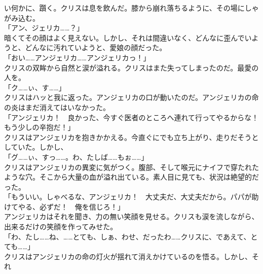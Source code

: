 \documentclass[b5j,10pt,openany]{jsbook}
\begin{document}
い何かに、躓く。クリスは息を飲んだ。膝から崩れ落ちるように、その場にしゃがみ込む。\\「アン、ジェリカ\ldots{}\ldots{}？」\\暗くてその顔はよく見えない。しかし、それは間違いなく、どんなに歪んでいようと、どんなに汚れていようと、愛娘の顔だった。\\「おい\ldots{}\ldots{}アンジェリカ\ldots{}\ldots{}アンジェリカっ！」\\クリスの双眸から自然と涙が溢れる。クリスはまた失ってしまったのだ。最愛の人を。\\「ク\ldots{}\ldots{}ぃ、す\ldots{}\ldots{}」\\クリスはハッと我に返った。アンジェリカの口が動いたのだ。アンジェリカの命の炎はまだ消えてはいなかった。\\「アンジェリカ！　良かった、今すぐ医者のところへ連れて行ってやるからな！　もう少しの辛抱だ！」\\クリスはアンジェリカを抱きかかえる。今直ぐにでも立ち上がり、走りだそうとしていた。しかし、\\「グ\ldots{}\ldots{}ぃ、すっ\ldots{}\ldots{}。わ、たしば\ldots{}\ldots{}もぉ\ldots{}\ldots{}」\\クリスはアンジェリカの異変に気がつく。腹部、そして喉元にナイフで穿たれたような穴。そこから大量の血が溢れ出ている。素人目に見ても、状況は絶望的だった。\\「もういい。しゃべるな、アンジェリカ！　大丈夫だ、大丈夫だから。パパが助けてやる、必ずだ！　俺を信じろ！」\\アンジェリカはそれを聞き、力の無い笑顔を見せる。クリスも涙を流しながら、出来るだけの笑顔を作ってみせた。\\「わ、たし\ldots{}\ldots{}ね、\ldots{}\ldots{}とても、しぁ、わせ、だったわ\ldots{}\ldots{}クリスに、であえて、とても\ldots{}\ldots{}」\\クリスはアンジェリカの命の灯火が揺れて消えかけているのを悟る。しかし、それ
\end{document}
